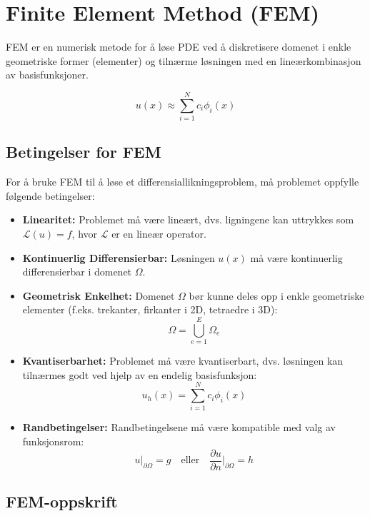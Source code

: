
\section{Finite Element Method (FEM)}

FEM er en numerisk metode for å løse PDE ved å diskretisere domenet i enkle geometriske former (elementer) og tilnærme løsningen med en lineærkombinasjon av basisfunksjoner.

\begin{equation}
    u(x) \approx \sum_{i=1}^N c_i \phi_i(x)
\end{equation}

\subsection*{Betingelser for FEM}

For å bruke FEM til å løse et differensiallikningsproblem, må problemet oppfylle følgende betingelser:

\begin{itemize}
    \item \textbf{Linearitet:} Problemet må være lineært, dvs. ligningene kan uttrykkes som \(\mathcal{L}(u) = f\), hvor \(\mathcal{L}\) er en lineær operator.
    \item \textbf{Kontinuerlig Differensierbar:} Løsningen \( u(x) \) må være kontinuerlig differensierbar i domenet \( \Omega \).
    \item \textbf{Geometrisk Enkelhet:} Domenet \( \Omega \) bør kunne deles opp i enkle geometriske elementer (f.eks. trekanter, firkanter i 2D, tetraedre i 3D):
          \[
              \Omega = \bigcup_{e=1}^{E} \Omega_e
          \]
    \item \textbf{Kvantiserbarhet:} Problemet må være kvantiserbart, dvs. løsningen kan tilnærmes godt ved hjelp av en endelig basisfunksjon:
          \[
              u_h(x) = \sum_{i=1}^{N} c_i \phi_i(x)
          \]
    \item \textbf{Randbetingelser:} Randbetingelsene må være kompatible med valg av funksjonsrom:
          \[
              u|_{\partial \Omega} = g \quad \text{eller} \quad \frac{\partial u}{\partial n}\bigg|_{\partial \Omega} = h
          \]
\end{itemize}

\subsection*{FEM-oppskrift}

